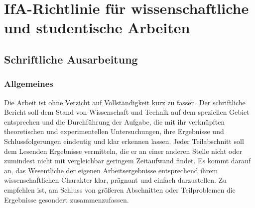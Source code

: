 
\chapter{IfA-Richtlinie für wissenschaftliche und studentische Arbeiten}
\label{sec:IfARichtlinieFürWissenschaftlicheUndStudentischeArbeiten}


\section{Schriftliche Ausarbeitung}
\label{sec:SchriftlicheAusarbeitung}

\subsection{Allgemeines}
\label{sec:Allgemeines2}

Die Arbeit ist ohne Verzicht auf Vollständigkeit kurz zu fassen. Der schriftliche Bericht soll dem Stand von Wissenschaft und Technik auf dem speziellen Gebiet entsprechen und die Durchführung der Aufgabe, die mit ihr verknüpften theoretischen und experimentellen Untersuchungen, ihre Ergebnisse und Schlussfolgerungen eindeutig und klar erkennen lassen. Jeder Teilabschnitt soll dem Lesenden Ergebnisse vermitteln, die er an einer anderen Stelle nicht oder zumindest nicht mit vergleichbar geringem Zeitaufwand findet. Es kommt darauf an, das Wesentliche der eigenen Arbeitsergebnisse entsprechend ihrem wissenschaftlichen Charakter klar, prägnant und einfach darzustellen. Zu empfehlen ist, am Schluss von größeren Abschnitten oder Teilproblemen die Ergebnisse gesondert zusammenzufassen.

